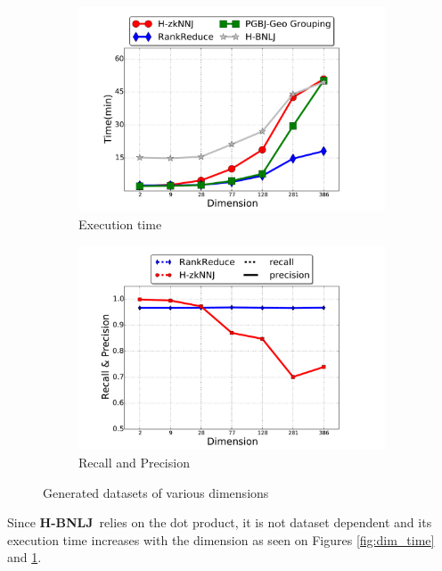 \documentclass[10pt,journal,compsoc]{IEEEtran}
\newcommand{\HBNLJ}{{\bf H-BNLJ}}
\begin{document}
\begin{figure}[ht]
	\centering
	\begin{subfigure}[b]{0.5\textwidth}
		\includegraphics[width=1\textwidth]{img-perf/dim/randtime.pdf} 
		\caption{Execution time%
		}
		\label{fig:rand_time}
	\end{subfigure}\begin{subfigure}[b]{0.5\textwidth}
	
	\includegraphics[width=1\textwidth]{img-perf/dim/randacc.pdf} 
	\caption{Recall and Precision}
	\label{fig:rand_acc}
\end{subfigure}%
\caption{Generated datasets of various dimensions}
\label{fig:dim_rand}
\end{figure} 


Since \HBNLJ~relies on the dot product, it is not dataset dependent and its execution time increases
with the dimension as seen on Figures \ref{fig:dim_time} and \ref{fig:rand_time}. 
\end{document}
